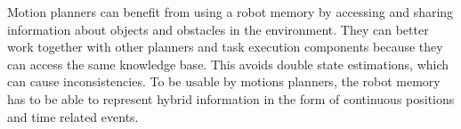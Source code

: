 Motion planners can benefit from using a robot memory by accessing and
sharing information about objects and obstacles in the environment.
They can better work together with other planners and task execution
components because they can access the same knowledge base. This
avoids double state estimations, which can cause inconsistencies. To
be usable by motions planners, the robot memory has to be able to
represent hybrid information in the form of continuous positions and
time related events.

